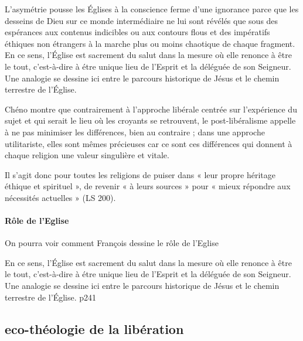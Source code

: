 \begin{singlequote}
    L'asymétrie pousse les Églises à la conscience ferme d'une ignorance parce que les desseins de Dieu sur ce monde intermédiaire ne lui sont révélés que sous des espérances aux contenus indicibles ou aux contours flous et des impératifs éthiques non étrangers à la marche plus ou moins chaotique de chaque fragment. En ce sens, l'Église est sacrement du salut dans la mesure où elle renonce à être le tout, c'est-à-dire à étre unique lieu de l'Esprit et la déléguée de son Seigneur. Une analogie se dessine ici entre le parcours historique de Jésus et le chemin terrestre de l'Église. \cite[p 241]{duquoc_unique_2002}

\end{singlequote}
\begin{singlequote}
    Chéno montre que contrairement à l’approche libérale centrée sur l’expérience du sujet et qui serait le lieu où les croyants se retrouvent, le post-libéralisme appelle à ne pas minimiser les différences, bien au contraire ; dans une approche utilitariste, elles sont mêmes précieuses car ce sont ces différences qui donnent à chaque religion une valeur singulière et vitale.  \cite{pisani_cheno_2018}
\end{singlequote}

\begin{singlequote}
    Il s’agit donc pour toutes les religions de puiser dans « leur propre héritage éthique et spirituel », de revenir « à leurs sources » pour « mieux répondre aux nécessités actuelles » (LS 200).
\end{singlequote}

\paragraph{Rôle de l'Eglise} On pourra voir comment François dessine le rôle de l'Eglise
\begin{singlequote}
En ce sens, l'Église est sacrement du salut dans la mesure où elle renonce à être le tout, c'est-à-dire à étre unique lieu de l'Esprit et la déléguée de son Seigneur. Une analogie se dessine ici entre le parcours historique de Jésus et le chemin terrestre de l'Église.    \cite{duquoc_unique_2002}
p241
\end{singlequote}
\subsection{eco-théologie de la libération}

